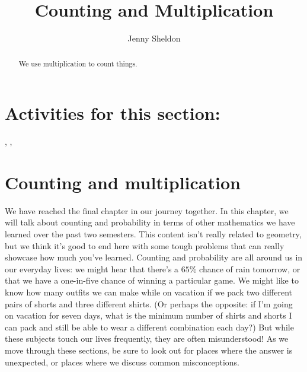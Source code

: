 \documentclass{ximera}
\title{Counting and Multiplication}
\author{Jenny Sheldon}
\begin{document}
\begin{abstract}
We use multiplication to count things.
\end{abstract}
\maketitle


\section{Activities for this section:} 
, 
, 



\section{Counting and multiplication}

We have reached the final chapter in our journey together. In this chapter, we will talk about counting and probability in terms of other mathematics we have learned over the past two semesters. This content isn't really related to geometry, but we think it's good to end here with some tough problems that can really showcase how much you've learned. Counting and probability are all around us in our everyday lives: we might hear that there's a $65\%$ chance of rain tomorrow, or that we have a one-in-five chance of winning a particular game. We might like to know how many outfits we can make while on vacation if we pack two different pairs of shorts and three different shirts. (Or perhaps the opposite: if I'm going on vacation for seven days, what is the minimum number of shirts and shorts I can pack and still be able to wear a different combination each day?) But while these subjects touch our lives frequently, they are often misunderstood! As we move through these sections, be sure to look out for places where the answer is unexpected, or places where we discuss common misconceptions.
\end{document}
